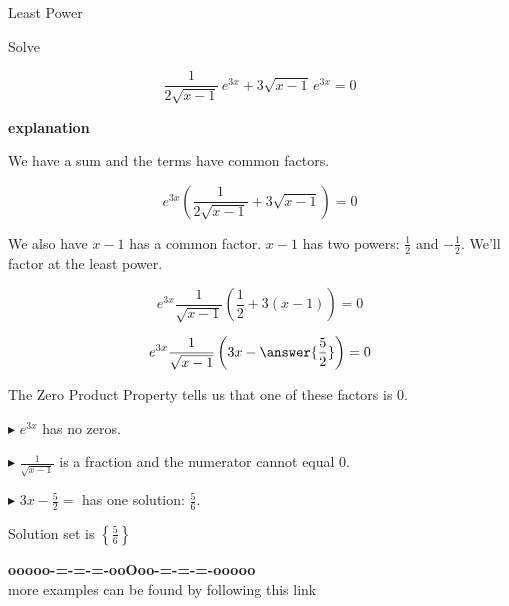\documentclass{ximera}
\begin{document}
\begin{example} Least Power



Solve 


\[  \frac{1}{2 \sqrt{x-1}} \, e^{3x}  + 3 \sqrt{x-1} \, e^{3x} = 0  \]


\textbf{\textcolor{red!75!green}{explanation}} 

We have a sum and the terms have common factors.



\[  e^{3x}  \left( \frac{1}{2 \sqrt{x-1}}  + 3 \sqrt{x-1}  \right) = 0  \]



We also have $x-1$ has a common factor.  $x-1$ has two powers: $\tfrac{1}{2}$ and $-\tfrac{1}{2}$.  We'll factor at the least power.


\[  e^{3x}  \frac{1}{\sqrt{x-1}}   \left( \frac{1}{2}  + 3 (x-1)  \right) = 0 \]

\[  e^{3x}  \frac{1}{\sqrt{x-1}}   \left( 3x - \answer{\frac{5}{2}}  \right) = 0  \]





The Zero Product Property tells us that one of these factors is $0$.



$\blacktriangleright$   $e^{3x}$ has no zeros. 


$\blacktriangleright$   $\frac{1}{\sqrt{x-1}}$ is a fraction and the numerator cannot equal $0$.


$\blacktriangleright$  $3x - \frac{5}{2} = $ has one solution:  $\frac{5}{6}$.



Solution set is $\left\{  \frac{5}{6} \right\}$


\end{example}

















\begin{center}
\textbf{\textcolor{green!50!black}{ooooo-=-=-=-ooOoo-=-=-=-ooooo}} \\

more examples can be found by following this link\\ 

\end{center}
\end{document}
